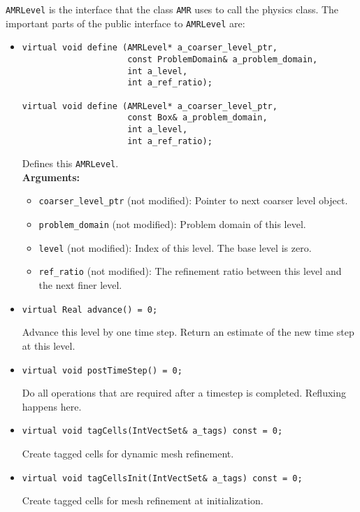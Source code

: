 {\tt AMRLevel} is the interface that the class {\tt AMR}
uses to call the physics class.   The important parts
of the public interface to {\tt AMRLevel} are:
\begin{itemize}

\item
\begin{verbatim}
virtual void define (AMRLevel* a_coarser_level_ptr,
                     const ProblemDomain& a_problem_domain,
                     int a_level,
                     int a_ref_ratio);

virtual void define (AMRLevel* a_coarser_level_ptr,
                     const Box& a_problem_domain,
                     int a_level,
                     int a_ref_ratio);
\end{verbatim}
Defines this \verb|AMRLevel|.
\\ {\bf Arguments:}
  \begin{itemize}
  \item
  \verb/coarser_level_ptr/ (not modified):
  Pointer to next coarser level object.
  \item
  \verb/problem_domain/ (not modified):
  Problem domain of this level.
  \item
  \verb/level/ (not modified):
  Index of this level.  The base level is zero.
  \item
  \verb/ref_ratio/ (not modified):
  The refinement ratio between this level and the next finer level.
  \end{itemize}

\item
\begin{verbatim}
virtual Real advance() = 0;
\end{verbatim}
Advance this level by one time step.
Return an estimate of the new time step at this level.

\item
\begin{verbatim}
virtual void postTimeStep() = 0;
\end{verbatim}
Do all operations that are required after a timestep is completed.
Refluxing happens here.

\item
\begin{verbatim}
virtual void tagCells(IntVectSet& a_tags) const = 0;
\end{verbatim}
Create tagged cells for dynamic mesh refinement.

\item
\begin{verbatim}
virtual void tagCellsInit(IntVectSet& a_tags) const = 0;
\end{verbatim}
Create tagged cells for mesh refinement at initialization.


\end{itemize}
